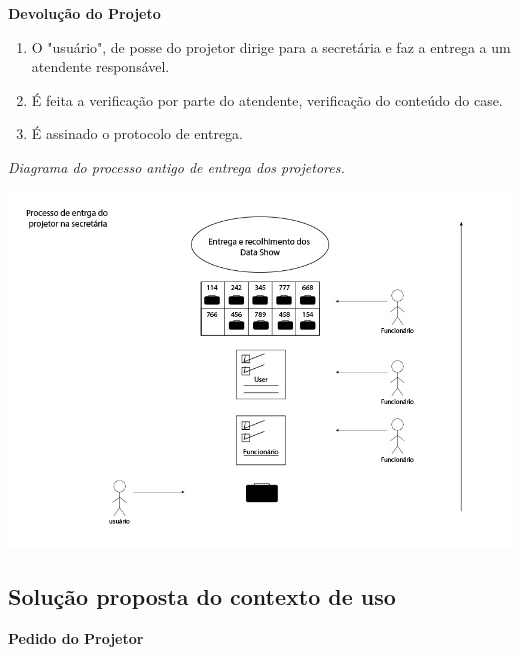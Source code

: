 \newpage


\textbf{Devolução do Projeto}

\begin{enumerate}
  
  \item O "usuário", de posse do projetor dirige para a secretária e faz a
    entrega a um atendente responsável. 

  \item É feita a verificação por parte do atendente, verificação do conteúdo do
    case. 

  \item É assinado o protocolo de entrega. 

\end{enumerate}


\textit{Diagrama do processo antigo de entrega dos projetores.}

  \begin{center}
    \includegraphics[scale=0.5]{imagens/fluxo3.jpg}\\
  \end{center}
  

\newpage

\subsection{Solução proposta do contexto de uso}

\textbf{Pedido do Projetor}

